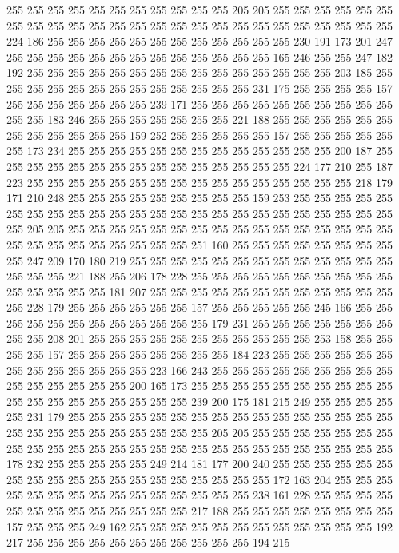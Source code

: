 255 255 255 255 255 255 255 255 255 255 255 205 205 255 255 255 255 255 255 255
255 255 255 255 255 255 255 255 255 255 255 255 255 255 255 255 255 255 224 186
255 255 255 255 255 255 255 255 255 255 255 255 230 191 173 201 247 255 255 255
255 255 255 255 255 255 255 255 255 255 165 246 255 255 247 182 192 255 255 255
255 255 255 255 255 255 255 255 255 255 255 255 203 185 255 255 255 255 255 255
255 255 255 255 255 255 255 231 175 255 255 255 255 157 255 255 255 255 255 255
255 239 171 255 255 255 255 255 255 255 255 255 255 255 255 183 246 255 255 255
255 255 255 255 221 188 255 255 255 255 255 255 255 255 255 255 255 255 159 252
255 255 255 255 255 157 255 255 255 255 255 255 173 234 255 255 255 255 255 255
255 255 255 255 255 255 255 200 187 255 255 255 255 255 255 255 255 255 255 255
255 255 255 255 224 177 210 255 187 223 255 255 255 255 255 255 255 255 255 255
255 255 255 255 255 255 218 179 171 210 248 255 255 255 255 255 255 255 255 255
159 253 255 255 255 255 255 255 255 255 255 255 255 255 255 255 255 255 255 255
255 255 255 255 255 255 255 205 205 255 255 255 255 255 255 255 255 255 255 255
255 255 255 255 255 255 255 255 255 255 255 255 255 255 251 160 255 255 255 255
255 255 255 255 255 247 209 170 180 219 255 255 255 255 255 255 255 255 255 255
255 255 255 255 255 255 221 188 255 206 178 228 255 255 255 255 255 255 255 255
255 255 255 255 255 255 255 181 207 255 255 255 255 255 255 255 255 255 255 255
255 255 228 179 255 255 255 255 255 255 157 255 255 255 255 255 245 166 255 255
255 255 255 255 255 255 255 255 255 255 179 231 255 255 255 255 255 255 255 255
255 208 201 255 255 255 255 255 255 255 255 255 255 255 253 158 255 255 255 255
157 255 255 255 255 255 255 255 255 184 223 255 255 255 255 255 255 255 255 255
255 255 255 255 223 166 243 255 255 255 255 255 255 255 255 255 255 255 255 255
255 255 200 165 173 255 255 255 255 255 255 255 255 255 255 255 255 255 255 255
255 255 255 255 239 200 175 181 215 249 255 255 255 255 255 231 179 255 255 255
255 255 255 255 255 255 255 255 255 255 255 255 255 255 255 255 255 255 255 255
255 255 255 205 205 255 255 255 255 255 255 255 255 255 255 255 255 255 255 255
255 255 255 255 255 255 255 255 255 255 255 178 232 255 255 255 255 255 249 214
181 177 200 240 255 255 255 255 255 255 255 255 255 255 255 255 255 255 255 255
255 255 255 172 163 204 255 255 255 255 255 255 255 255 255 255 255 255 255 255
255 238 161 228 255 255 255 255 255 255 255 255 255 255 255 255 255 217 188 255
255 255 255 255 255 255 255 157 255 255 255 249 162 255 255 255 255 255 255 255
255 255 255 255 255 192 217 255 255 255 255 255 255 255 255 255 255 255 194 215
